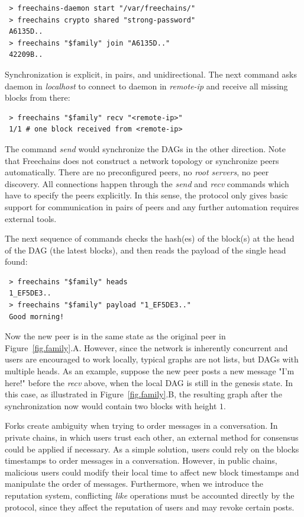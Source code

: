 \documentclass[10pt,journal,compsoc]{IEEEtran}
\newcommand{\FC}   {Freechains\xspace}
\begin{document}
{\footnotesize
\begin{verbatim}
 > freechains-daemon start "/var/freechains/"
 > freechains crypto shared "strong-password"
 A6135D..
 > freechains "$family" join "A6135D.."
 42209B..
\end{verbatim}
}

Synchronization is explicit, in pairs, and unidirectional.
The next command asks daemon in \emph{localhost} to connect to daemon in
\emph{remote-ip} and receive all missing blocks from there:

{\footnotesize
\begin{verbatim}
 > freechains "$family" recv "<remote-ip>"
 1/1 # one block received from <remote-ip>
\end{verbatim}
}

The command \emph{send} would synchronize the DAGs in the other direction.
Note that \FC does not construct a network topology or synchronize peers
automatically.
There are no preconfigured peers, no \emph{root servers}, no peer discovery.
All connections happen through the \emph{send} and \emph{recv} commands which
have to specify the peers explicitly.
In this sense, the protocol only gives basic support for communication in pairs
of peers and any further automation requires external tools.

The next sequence of commands checks the hash(es) of the block(s) at the head
of the DAG (the latest blocks), and then reads the payload of the single head
found:

{\footnotesize
\begin{verbatim}
 > freechains "$family" heads
 1_EF5DE3..
 > freechains "$family" payload "1_EF5DE3.."
 Good morning!
\end{verbatim}
}

Now the new peer is in the same state as the original peer in
Figure~\ref{fig.family}.A.
However, since the network is inherently concurrent and users are encouraged to
work locally, typical graphs are not lists, but DAGs with multiple heads.
As an example, suppose the new peer posts a new message "I'm here!" before the
\emph{recv} above, when the local DAG is still in the genesis state.
In this case, as illustrated in Figure~\ref{fig.family}.B, the resulting graph
after the synchronization now would contain two blocks with height $1$.

Forks create ambiguity when trying to order messages in a conversation.
In private chains, in which users trust each other, an external method for
consensus could be applied if necessary.
As a simple solution, users could rely on the blocks timestamps to order
messages in a conversation.
However, in public chains, malicious users could modify their local time to
affect new block timestamps and manipulate the order of messages.
Furthermore, when we introduce the reputation system, conflicting \emph{like}
operations must be accounted directly by the protocol, since they affect the
reputation of users and may revoke certain posts.
\end{document}
